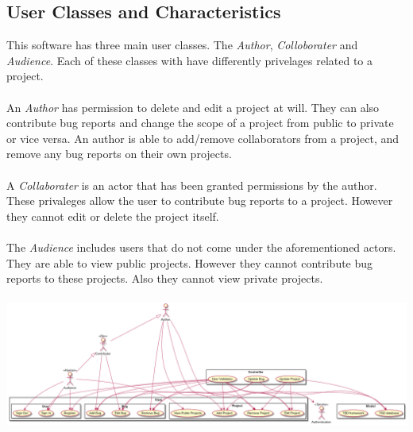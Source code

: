 \documentclass{article}
\newcommand{\comment}[1]{}
\begin{document}
\subsection{User Classes and Characteristics}\label{userClass}
\comment{
Identify the various user classes that you anticipate will use this product. User classes may be differentiated based on the frequency of use, subset of product functions used, technical expertise, security or privelege levels, educational level, or experience. Describe the pertinent characteristics of each user class. Certain requirements may pertain only to certain user classes. Distinguish the most import user classes for this product from those who are less important to satisfy.
}
This software has three main user classes. The \emph{Author}, \emph{Colloborater} and \emph{Audience}. Each of these classes with have differently privelages related to a project.
\\ \\
An \emph{Author} has permission to delete and edit a project at will. They can also contribute bug reports and change the scope of a project from public to private or vice versa. An author is able to add/remove collaborators from a project, and remove any bug reports on their own projects.
\\ \\
A \emph{Collaborater} is an actor that has been granted permissions by the author. These privaleges allow the user to contribute bug reports to a project. However they cannot edit or delete the project itself.
\\ \\
The \emph{Audience} includes users that do not come under the aforementioned actors. They are able to view public projects. However they cannot contribute bug reports to these projects. Also they cannot view private projects.
\\ \\
\includegraphics[width=\textwidth]{useCaseDiagram.png}
\end{document}
